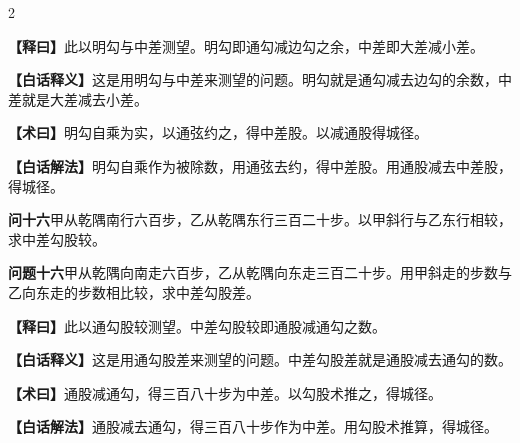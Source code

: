 \documentclass[11pt,a4paper]{article}
\newcommand{\WenQuestion}[1]{\textbf{\textcolor{classicalcolor}{#1}}}
\newcommand{\BaiQuestion}[1]{\textbf{\textcolor{moderncolor}{#1}}}
\newcommand{\WenExplain}{\textcolor{classicalcolor}{\textbf{【释曰】}}}
\newcommand{\BaiExplain}{\textcolor{moderncolor}{\textbf{【白话释义】}}}
\newcommand{\WenMethod}{\textcolor{classicalcolor}{\textbf{【术曰】}}}
\newcommand{\BaiMethod}{\textcolor{moderncolor}{\textbf{【白话解法】}}}
\begin{document}
\begin{paracol}{2}
\switchcolumn*
\begin{tcolorbox}[colback=red!5,colframe=red!30!black,boxrule=0.3pt]
\WenExplain\quad 此以明勾与中差测望。明勾即通勾减边勾之余，中差即大差减小差。
\end{tcolorbox}
\switchcolumn
\begin{tcolorbox}[colback=blue!5,colframe=blue!30!black,boxrule=0.3pt]
\BaiExplain\quad 这是用明勾与中差来测望的问题。明勾就是通勾减去边勾的余数，中差就是大差减去小差。
\end{tcolorbox}

\switchcolumn*
\begin{tcolorbox}[colback=red!5,colframe=red!40!black,boxrule=0.3pt]
\WenMethod\quad 明勾自乘为实，以通弦约之，得中差股。以减通股得城径。
\end{tcolorbox}
\switchcolumn
\begin{tcolorbox}[colback=blue!5,colframe=blue!40!black,boxrule=0.3pt]
\BaiMethod\quad 明勾自乘作为被除数，用通弦去约，得中差股。用通股减去中差股，得城径。
\end{tcolorbox}

\vspace{0.8em}

\switchcolumn*
\begin{tcolorbox}[colback=red!3,colframe=red!30!black,boxrule=0.3pt]
\WenQuestion{问十六}\quad 甲从乾隅南行六百步，乙从乾隅东行三百二十步。以甲斜行与乙东行相较，求中差勾股较。
\end{tcolorbox}
\switchcolumn
\begin{tcolorbox}[colback=blue!3,colframe=blue!30!black,boxrule=0.3pt]
\BaiQuestion{问题十六}\quad 甲从乾隅向南走六百步，乙从乾隅向东走三百二十步。用甲斜走的步数与乙向东走的步数相比较，求中差勾股差。
\end{tcolorbox}

\switchcolumn*
\begin{tcolorbox}[colback=red!5,colframe=red!30!black,boxrule=0.3pt]
\WenExplain\quad 此以通勾股较测望。中差勾股较即通股减通勾之数。
\end{tcolorbox}
\switchcolumn
\begin{tcolorbox}[colback=blue!5,colframe=blue!30!black,boxrule=0.3pt]
\BaiExplain\quad 这是用通勾股差来测望的问题。中差勾股差就是通股减去通勾的数。
\end{tcolorbox}

\switchcolumn*
\begin{tcolorbox}[colback=red!5,colframe=red!40!black,boxrule=0.3pt]
\WenMethod\quad 通股减通勾，得三百八十步为中差。以勾股术推之，得城径。
\end{tcolorbox}
\switchcolumn
\begin{tcolorbox}[colback=blue!5,colframe=blue!40!black,boxrule=0.3pt]
\BaiMethod\quad 通股减去通勾，得三百八十步作为中差。用勾股术推算，得城径。
\end{tcolorbox}


\end{paracol}
\end{document}
